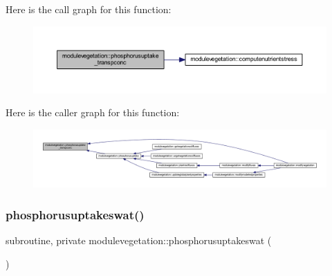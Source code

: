 Here is the call graph for this function\+:\nopagebreak
\begin{figure}[H]
\begin{center}
\leavevmode
\includegraphics[width=350pt]{namespacemodulevegetation_a00089a428473ea96d0f567289aabe4f8_cgraph}
\end{center}
\end{figure}
Here is the caller graph for this function\+:\nopagebreak
\begin{figure}[H]
\begin{center}
\leavevmode
\includegraphics[width=350pt]{namespacemodulevegetation_a00089a428473ea96d0f567289aabe4f8_icgraph}
\end{center}
\end{figure}
\mbox{\label{namespacemodulevegetation_a4d0b983635068517bf0b541f0784430a}} 
\subsubsection{\texorpdfstring{phosphorusuptakeswat()}{phosphorusuptakeswat()}}
{\footnotesize\ttfamily subroutine, private modulevegetation\+::phosphorusuptakeswat (\begin{DoxyParamCaption}{ }\end{DoxyParamCaption})\hspace{0.3cm}{\ttfamily [private]}}

